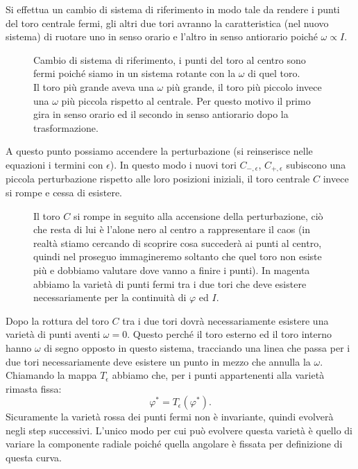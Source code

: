 Si effettua un cambio di sistema di riferimento in modo tale da rendere i punti del toro centrale fermi, gli altri due tori avranno la caratteristica (nel nuovo sistema) di ruotare uno in senso orario e l'altro in senso antiorario poiché $\omega\propto I$.
\begin{figure}[H]
    \centering
    \caption{\scriptsize Cambio di sistema di riferimento, i punti del toro al centro sono fermi poiché siamo in un sistema rotante con la $\omega$ di quel toro. \\
    Il toro più grande aveva una $\omega$ più grande, il toro più piccolo invece una $\omega$ più piccola rispetto al centrale. Per questo motivo il primo gira in senso orario ed il secondo in senso antiorario dopo la trasformazione.}
    \label{fig:19_tori}
\end{figure}
\noindent
A questo punto possiamo accendere la perturbazione (si reinserisce nelle equazioni i termini con $\epsilon$). In questo modo i nuovi tori $C_{-,\epsilon}$, $C_{+, \epsilon}$ subiscono una piccola perturbazione rispetto alle loro posizioni iniziali, il toro centrale $C$ invece si rompe e cessa di esistere.
\begin{figure}[H]
    \centering
    \caption{\scriptsize Il toro $C$ si rompe in seguito alla accensione della perturbazione, ciò che resta di lui è l'alone nero al centro a rappresentare il caos (in realtà stiamo cercando di scoprire cosa succederà ai punti al centro, quindi nel proseguo immagineremo soltanto che quel toro non esiste più e dobbiamo valutare dove vanno a finire i punti). In magenta abbiamo la varietà di punti fermi tra i due tori che deve esistere necessariamente per la continuità di $\varphi$ ed $I$.}
    \label{fig:19_tori_rotto}
\end{figure}
\noindent
Dopo la rottura del toro $C$  tra i due tori dovrà necessariamente esistere una varietà di punti aventi $\omega =0$. Questo perché il toro esterno ed il toro interno hanno $\omega$  di segno opposto in questo sistema, tracciando una linea che passa per i due tori necessariamente deve esistere un punto in mezzo che annulla la $\omega$. \\
Chiamando la mappa $T_{\epsilon}$ abbiamo che, per i punti appartenenti alla varietà rimasta fissa:
\[
    \varphi^* = T_{\epsilon}(\varphi^*)
.\] 
Sicuramente la varietà rossa dei punti fermi non è invariante, quindi evolverà negli step successivi. L'unico modo per cui può evolvere questa varietà è quello di variare la componente radiale poiché quella angolare è fissata per definizione di questa curva. \\
